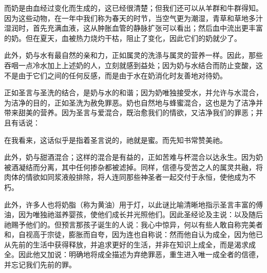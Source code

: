 而奶是由血经过变化而生成的，这已经很清楚；但我们还可以从羊群和牛群得知。因为这些动物，在一年中我们称为春天的时节，当空气更为潮湿，青草和草地多汁湿润时，首先充满血液，这从肿胀血管的静脉扩张可以看出；然后血中流出更丰富的奶。但在夏天，血被热力烧灼干枯，阻止了变化，因此它们的奶就少了。\par

此外，奶与水有最自然的亲和力，正如属灵的洗涤与属灵的营养一样。因此，那些吞咽一点冷水加上上述奶的人，立刻就感到益处；因为奶与水结合而防止变酸，这不是由于它们之间的任何反感，而是由于水在奶消化时友善地对待奶。\par

正如圣言与圣洗的结合，是奶与水的和谐；因为奶唯独接受水，并允许与水混合，为洁净的目的，正如圣洗为赦免罪恶。奶也自然地与蜂蜜混合，这也是为了洁净并带来甜美的营养。因为圣言与爱混合，既治愈我们的情欲，又洁净我们的罪恶；并且有话说：\par

\par

在我看来，这话似乎是指着圣言说的，祂就是蜜。而先知书常赞美祂。\par

此外，奶与甜酒混合；这样的混合是有益的，正如苦难与杯混合以达永生。因为奶被酒凝结而分离，其中任何掺杂都被滤掉。同样，信德与受苦之人的属灵共融，将肉体的情欲如同浆液般排除，将人连同那些神圣者一起交付于永恒，使他成为不朽。\par

此外，许多人也将奶脂（称为黄油）用于灯，以此谜比喻清晰地指示圣言丰富的傅油，因为唯独祂滋养婴孩，使他们成长并光照他们。因此圣经论及主说：以及随后祂赐予他们的。但预言那孩子诞生的人说：我心中惊异，何以有些人敢自称完美者和，自视高于宗徒，膨胀而自夸，因为连也自称说：然而他自认为成全，因为他已从先前的生活中获得释放，并追求更好的生活，并非在知识上成全，而是渴求成全。因此他又加说：明确地将成全描述为弃绝罪恶，重生进入唯一成全者的信德，并忘记我们先前的罪。\par

